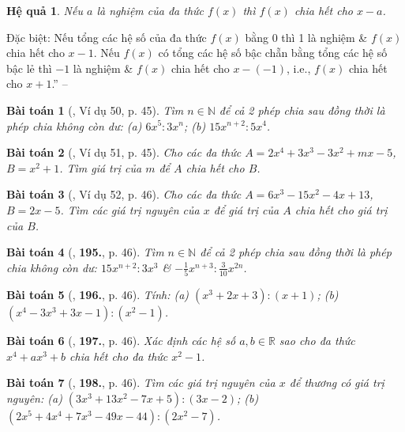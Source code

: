 \documentclass{article}
\numberwithin{equation}{section}
\newtheorem{baitoan}{Bài toán}
\newtheorem{hequa}{Hệ quả}[section]
\begin{document}
\begin{hequa}
	Nếu $a$ là nghiệm của đa thức $f(x)$ thì $f(x)$ chia hết cho $x - a$.
\end{hequa}
Đặc biệt: Nếu tổng các hệ số của đa thức $f(x)$ bằng 0 thì 1 là nghiệm \& $f(x)$ chia hết cho $x - 1$. Nếu $f(x)$ có tổng các hệ số bậc chẵn bằng tổng các hệ số bậc lẻ thì $-1$ là nghiệm \& $f(x)$ chia hết cho $x - (-1)$, i.e., $f(x)$ chia hết cho $x + 1$.'' -- \cite[Chap. III, \S5, pp. 44--45]{Tuyen_Toan_7}

\begin{baitoan}[\cite{Tuyen_Toan_7}, Ví dụ 50, p. 45]
	Tìm $n\in\mathbb{N}$ để cả 2 phép chia sau đồng thời là phép chia không còn dư: (a) $6x^5:3x^n$; (b) $15x^{n+2}:5x^4$.
\end{baitoan}

\begin{baitoan}[\cite{Tuyen_Toan_7}, Ví dụ 51, p. 45]
	Cho các đa thức $A = 2x^4 + 3x^3 - 3x^2 + mx - 5$, $B = x^2 + 1$. Tìm giá trị của $m$ để $A$ chia hết cho $B$.
\end{baitoan}

\begin{baitoan}[\cite{Tuyen_Toan_7}, Ví dụ 52, p. 46]
	Cho các đa thức $A = 6x^3 - 15x^2 - 4x + 13$, $B = 2x - 5$. Tìm các giá trị nguyên của $x$ để giá trị của $A$ chia hết cho giá trị của $B$.
\end{baitoan}

\begin{baitoan}[\cite{Tuyen_Toan_7}, \textbf{195.}, p. 46]
	Tìm $n\in\mathbb{N}$ để cả 2 phép chia sau đồng thời là phép chia không còn dư: $15x^{n+2}:3x^3$ \& $-\frac{1}{5}x^{n+3}:\frac{3}{10}x^{2n}$.
\end{baitoan}

\begin{baitoan}[\cite{Tuyen_Toan_7}, \textbf{196.}, p. 46]
	Tính: (a) $(x^3 + 2x + 3):(x + 1)$; (b) $(x^4 - 3x^3 + 3x - 1):(x^2 - 1)$.
\end{baitoan}

\begin{baitoan}[\cite{Tuyen_Toan_7}, \textbf{197.}, p. 46]
	Xác định các hệ số $a,b\in\mathbb{R}$ sao cho đa thức $x^4 + ax^3 + b$ chia hết cho đa thức $x^2 - 1$.
\end{baitoan}

\begin{baitoan}[\cite{Tuyen_Toan_7}, \textbf{198.}, p. 46]
	Tìm các giá trị nguyên của $x$ để thương có giá trị nguyên: (a) $(3x^3 + 13x^2 - 7x + 5):(3x - 2)$; (b) $(2x^5 + 4x^4 + 7x^3 - 49x - 44):(2x^2 - 7)$.
\end{baitoan}
\end{document}
